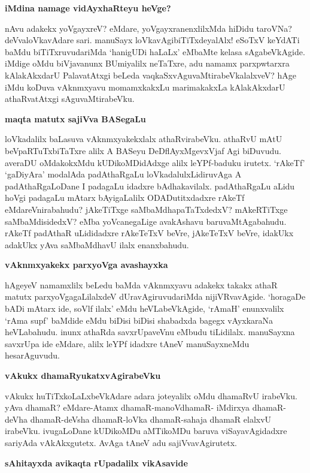 {\bigskip
\noindent
{\large\bf iMdina namage vidAyxhaRteyu heVge?}}\label{page109a}
\medskip

\noindent
nAvu adakekx yoVgayxreV? eMdare, yoVgayxranenxlilxMda hiDidu taroVNa? 
deVvaloVkavAdare sari. manuSayx loVkavAgibiTiTxdeyalAlx! eSoTxV keYdATi baMdu biTiTxruvudariMda `hanigUDi haLaLx' eMbaMte kelasa sAgabeVkAgide. iMdige oMdu biVjavanunx BUmiyalilx neTaTxre, adu namamx parxpwtarxra kAlakAkxdarU PalavatAtxgi beLeda vaqkaSxvAguvaMtirabeVkalalxveV? hAge iMdu koDuva vAknmxyavu momamxkakxLu marimakakxLa kAlakAkxdarU athaRvatAtxgi sAguvaMtirabeVku.

{\bigskip
\noindent
{\large\bf maqta matutx sajiVva BASegaLu}}\label{page109b}
\medskip

\noindent
loVkadalilx baLasuva vAknmxyakekxlalx athaRvirabeVku. athaRvU mAtU 
beVpaRTuTxbiTaTxre alilx A BASeyu DeDflAyxMgevxVjaf Agi biDuvudu. 
averaDU oMdakokxMdu kUDikoMDidAdxge alilx leYPf-baduku irutetx. `rAkeTf' `gaDiyAra' modalAda padAthaRgaLu loVkadalulxLidiruvAga A padAthaRgaLoDane I padagaLu idadxre bAdhakavilalx. padAthaRgaLu aLidu hoVgi padagaLu mAtarx bAyigaLalilx ODADutitxdadxre rAkeTf eMdareVnirabahudu? jAkeTiTxge saMbaMdhapaTaTxdedxV? mAkeRTiTxge saMbaMdisidedxV? eMba yoVcanegaLige avakAshavu baruvaMtAgabahudu. rAkeTf padAthaR uLididadxre rAkeTeTxV beVre, jAkeTeTxV beVre, idakUkx adakUkx yAva saMbaMdhavU ilalx enanxbahudu.

{\bigskip
\noindent
{\large\bf vAknmxyakekx parxyoVga avashayxka}}\label{page110}
\medskip

\noindent
hAgeyeV namamxlilx beLedu baMda vAknmxyavu adakekx takakx athaR matutx parxyoVgagaLilalxdeV dUravAgiruvudariMda nijiVRvavAgide. `horagaDe bADi mAtarx ide, soVlf ilalx' eMdu heVLabeVkAgide, `rAmaH' enunxvalilx `rAma supf' baMdide eMdu biDisi biDisi shabadxda bagegx vAyxkaraNa heVLabahudu. inunx athaRda savxrUpaveVnu eMbudu tiLidilalx. manuSayxna savxrUpa ide eMdare, alilx leYPf idadxre tAneV manuSayxneMdu hesarAguvudu.

{\bigskip
\noindent
{\large\bf vAkukx dhamaRyukatxvAgirabeVku}}\label{page110a}
\medskip

\noindent
vAkukx huTiTxkoLaLxbeVkAdare adara joteyalilx oMdu dhamaRvU irabeVku. 
yAva dhamaR? eMdare-Atamx dhamaR-manoVdhamaR- 
iMdirxya dhamaR-deVha dhamaR-deVsha dhamaR-loVka dhamaR-sahaja dhamaR elalxvU irabeVku. ivugaLoDane kUDikoMDu aMTikoMDu baruva viSayavAgidadxre sariyAda vAkAkxgutetx. AvAga tAneV adu sajiVvavAgirutetx. 

{\bigskip
\noindent
{\large\bf sAhitayxda avikaqta rUpadalilx vikAsavide}}\label{page110b}
\medskip

